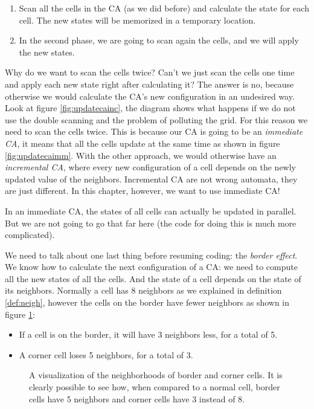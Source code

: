 \begin{enumerate}
\item Scan all the cells in the CA (as we did before) and calculate the state for each cell.
The new states will be memorized in a temporary location.
\item In the second phase, we are going to scan again the cells, and we will apply the new states.
\end{enumerate}

Why do we want to scan the cells twice? Can't we just scan the cells one time and apply each new state
right after calculating it? The answer is no, because otherwise we would calculate the CA's new configuration
in an undesired way. Look at figure \ref{fig:updatecainc},
the diagram shows what happens if we do not use the double
scanning and the problem of polluting the grid. For this reason we need to scan the cells twice. This is because
our CA is going to be an \textit{immediate CA}, it means that all the cells update at the same time
as shown in figure \ref{fig:updatecaimm}.
With the other
approach, we would otherwise have an \textit{incremental CA}, where every new configuration of a cell depends on the
newly updated value of the neighbors. Incremental CA are not wrong automata,
they are just different. In this chapter,
however, we want to use immediate CA!

In an immediate CA, the states of all cells can actually be updated in parallel. But we are not going to go
that far here (the code for doing this is much more complicated).

We need to talk about one last thing before resuming coding: the \textit{border effect}. We know how to
calculate the next configuration of a CA: we need to compute all the new states of all the cells. And the state
of a cell depends on the state of its neighbors. Normally a cell has 8 neighbors as we explained in definition
\ref{def:neigh}, however the cells on the border have fewer neighbors as shown in figure \ref{fig:bordercells}:

\begin{itemize}
\item If a cell is on the border, it will have 3 neighbors less, for a total of 5.
\item A corner cell loses 5 neighbors, for a total of 3.
\end{itemize}

%
\begin{figure}[b]
\sidecaption

%
%
\caption{A visualization of the neighborhoods of border and corner cells.
It is clearly possible to see how, when compared to a normal cell, border cells have 5 neighbors and
corner cells have 3 instead of 8.}
\label{fig:bordercells}
\end{figure}
%

